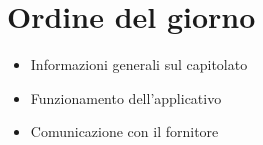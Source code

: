\section{Ordine del giorno}
\begin{itemize}
    \item Informazioni generali sul capitolato
    \item Funzionamento dell'applicativo
    \item Comunicazione con il fornitore
\end{itemize}